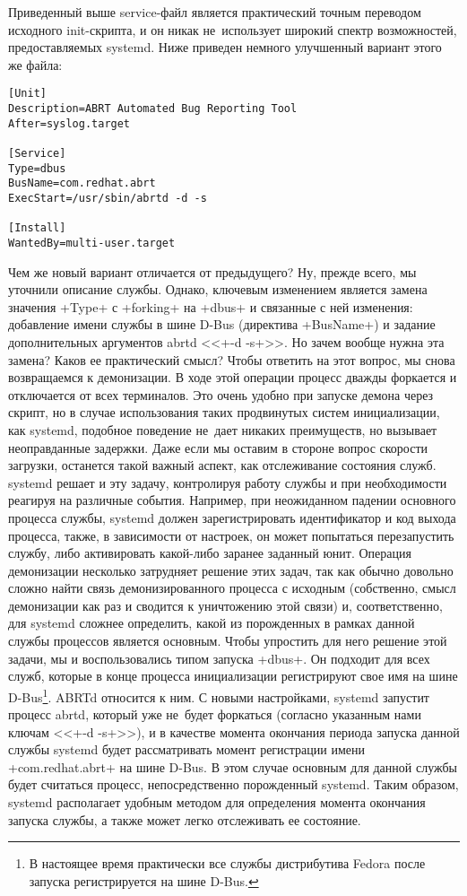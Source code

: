 \documentclass[10pt,oneside,a4paper]{article}
\begin{document}
Приведенный выше service-файл является практический точным переводом
исходного init-скрипта, и он никак не~использует широкий спектр возможностей,
предоставляемых systemd. Ниже приведен немного улучшенный вариант этого же
файла: 

\begin{Verbatim}
[Unit]
Description=ABRT Automated Bug Reporting Tool
After=syslog.target

[Service]
Type=dbus
BusName=com.redhat.abrt
ExecStart=/usr/sbin/abrtd -d -s

[Install]
WantedBy=multi-user.target
\end{Verbatim}

Чем же новый вариант отличается от предыдущего? Ну, прежде всего, мы уточнили
описание службы. Однако, ключевым изменением является замена значения +Type+ с +forking+
на +dbus+ и связанные с ней изменения: добавление имени службы в шине D-Bus
(директива +BusName+) и задание дополнительных аргументов abrtd <<+-d -s+>>. Но
зачем вообще нужна эта замена? Каков ее практический смысл? Чтобы ответить на
этот вопрос, мы снова возвращаемся к демонизации. В ходе этой операции процесс
дважды форкается и отключается от всех терминалов. Это очень удобно при запуске
демона через скрипт, но в случае использования таких продвинутых систем
инициализации, как systemd, подобное поведение не~дает никаких преимуществ, но
вызывает неоправданные задержки. Даже если мы оставим в стороне вопрос скорости
загрузки, останется такой важный аспект, как отслеживание состояния служб.
systemd решает и эту задачу, контролируя работу службы и при необходимости
реагируя на различные события. Например, при неожиданном падении основного
процесса службы, systemd должен зарегистрировать идентификатор и код выхода
процесса, также, в зависимости от настроек, он может попытаться перезапустить
службу, либо активировать какой-либо заранее заданный юнит. Операция
демонизации несколько затрудняет решение этих задач, так как обычно довольно
сложно найти связь демонизированного процесса с исходным (собственно, смысл
демонизации как раз и сводится к уничтожению этой связи) и, соответственно, для
systemd сложнее определить, какой из порожденных в рамках данной службы
процессов является основным. Чтобы упростить для него решение этой задачи, мы и
воспользовались типом запуска +dbus+. Он подходит для всех служб, которые в
конце процесса инициализации регистрируют свое имя на шине D-Bus\footnote{В
настоящее время практически все службы дистрибутива Fedora после запуска
регистрируется на шине D-Bus.}. ABRTd относится к ним.  С новыми настройками,
systemd запустит процесс abrtd, который уже не~будет форкаться (согласно
указанным нами ключам <<+-d -s+>>), и в качестве момента окончания периода
запуска данной службы systemd будет рассматривать момент регистрации имени
+com.redhat.abrt+ на шине D-Bus. В этом случае основным для данной службы будет
считаться процесс, непосредственно порожденный systemd.  Таким образом, systemd
располагает удобным методом для определения момента окончания запуска службы, а
также может легко отслеживать ее состояние. 
\end{document}
